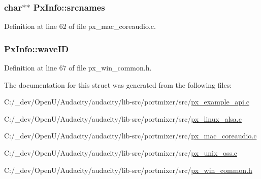 \subsubsection[{\texorpdfstring{srcnames}{srcnames}}]{\setlength{\rightskip}{0pt plus 5cm}char$\ast$$\ast$ Px\+Info\+::srcnames}\hypertarget{struct_px_info_a785fd286c6d4798194d4dcb75ab16d9f}{}\label{struct_px_info_a785fd286c6d4798194d4dcb75ab16d9f}


Definition at line 62 of file px\+\_\+mac\+\_\+coreaudio.\+c.

\subsubsection[{\texorpdfstring{wave\+ID}{waveID}}]{ Px\+Info\+::wave\+ID}\hypertarget{struct_px_info_a693ca06e98b478b21260aa7c801b1166}{}\label{struct_px_info_a693ca06e98b478b21260aa7c801b1166}


Definition at line 67 of file px\+\_\+win\+\_\+common.\+h.



The documentation for this struct was generated from the following files\+:\begin{DoxyCompactItemize}
\item 
C\+:/\+\_\+dev/\+Open\+U/\+Audacity/audacity/lib-\/src/portmixer/src/\hyperlink{px__example__api_8c}{px\+\_\+example\+\_\+api.\+c}\item 
C\+:/\+\_\+dev/\+Open\+U/\+Audacity/audacity/lib-\/src/portmixer/src/\hyperlink{px__linux__alsa_8c}{px\+\_\+linux\+\_\+alsa.\+c}\item 
C\+:/\+\_\+dev/\+Open\+U/\+Audacity/audacity/lib-\/src/portmixer/src/\hyperlink{px__mac__coreaudio_8c}{px\+\_\+mac\+\_\+coreaudio.\+c}\item 
C\+:/\+\_\+dev/\+Open\+U/\+Audacity/audacity/lib-\/src/portmixer/src/\hyperlink{px__unix__oss_8c}{px\+\_\+unix\+\_\+oss.\+c}\item 
C\+:/\+\_\+dev/\+Open\+U/\+Audacity/audacity/lib-\/src/portmixer/src/\hyperlink{px__win__common_8h}{px\+\_\+win\+\_\+common.\+h}\end{DoxyCompactItemize}
